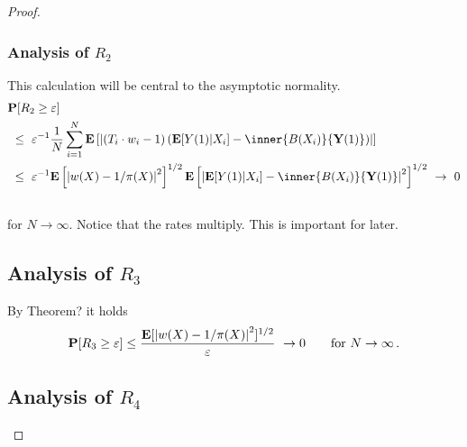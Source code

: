 \begin{proof}
  \subsubsection*{Analysis of $R_2$}
This calculation will be central to the asymptotic normality.
\begin{align*}
  &
  \P[R_2\ge \varepsilon]
  \\
  &
  \ 
  \le
  \ 
  \varepsilon^{-1}
  \frac{1}{N}\sum_{i=1}^{N} 
  \E
  \left[ 
\left| 
    \left( T_i\cdot w_i -1 \right)
    \left( 
    \E[Y(1)| X_i]
    -
    \inner
    {B(X_i)}
    { \mathbf{Y}(1) }
    \right)
\right|
  \right]
  \\
  &
  \ 
  \le
  \ 
  \varepsilon^{-1}
  \E
  \left[ 
\left| 
    w(X) - 1/\pi(X)
\right|
^2
  \right]
  ^{1/2}
  \E
  \left[ 
\left| 
    \E[Y(1)| X_i]
    -
    \inner
    {B(X_i)}
    { \mathbf{Y}(1) }
\right|
^2
  \right]
  ^{1/2}
  \ 
  \to
  \ 
  0
  \\
  &
\end{align*}
for $N\to\infty$. 
Notice that the rates multiply. This is important for later.
\subsection*{Analysis of $R_3$}
By Theorem?
it holds
\begin{gather*}
  \P[R_3\ge \varepsilon]\le
  \frac{\E[\left| w(X) - 1/\pi(X)\right|^2]^{1/2}}{\varepsilon}
  \ 
  \to
  0
  \qquad
  \text{for}\ 
  N
  \to
  \infty
  \,.
\end{gather*}
\subsection*{Analysis of $R_4$}
\end{proof}


